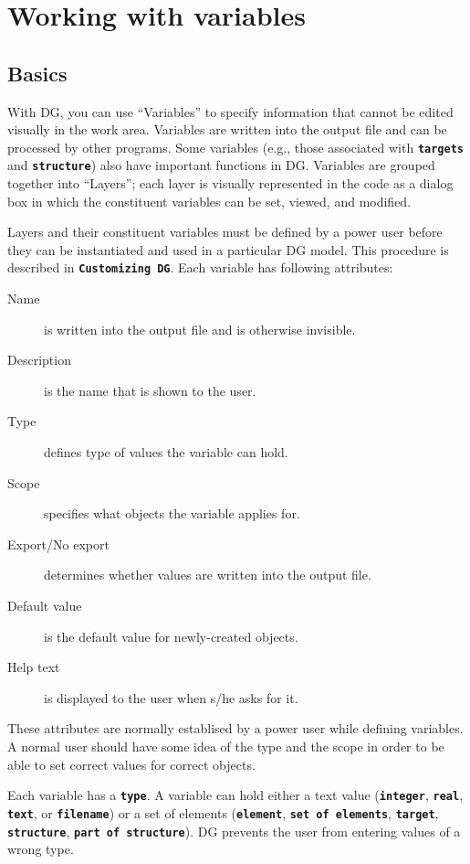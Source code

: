 \documentclass[12pt]{report}
\begin{document}
\chapter{Working with variables}

\section{Basics}

With DG, you can use ``Variables'' to specify information that cannot be
edited visually in the work area. Variables are written into the output
file and can be processed by other programs. Some variables (e.g., those
associated with \textbf{\texttt{targets}}
and \textbf{\texttt{structure}}) 
also have important functions in DG.  Variables are grouped
together into ``Layers''; each layer is visually represented
in the code as a dialog box in which the constituent variables can
be set, viewed, and modified.

Layers and their constituent variables must be defined  
by a power user before they can be instantiated and used
in a particular DG model. This
procedure is described in \textbf{\texttt{Customizing DG}}. Each
variable has following attributes:

\begin{description}
  \item[Name] is written into the output file and is
otherwise invisible.
  \item[Description] is the name that is shown to the user.
  \item[Type] defines type of values the variable can hold.
  \item[Scope] specifies what objects the variable applies
for.
  \item[Export/No export] determines whether values are
written into the output file.
  \item[Default value] is the default value for newly-created
objects.
  \item[Help text] is displayed to the user when s/he asks
for it.
\end{description}

These attributes are normally establised by a power user while defining
variables. A normal user should have some idea of the type and the scope
in order to be able to set correct values for correct objects.

Each variable has a \textbf{\texttt{type}}. A variable can hold either
a text value (\textbf{\texttt{integer}}, \textbf{\texttt{real}}, 
\textbf{\texttt{text}}, or \textbf{\texttt{filename}}) or a set of elements
(\textbf{\texttt{element}}, \textbf{\texttt{set of elements}},
\textbf{\texttt{target}}, \textbf{\texttt{structure}},
\textbf{\texttt{part of structure}}). DG prevents the user from
entering values of a wrong type.
\end{document}

